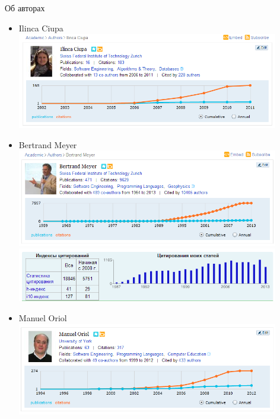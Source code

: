 \documentclass[11pt,pdf,hyperref=unicode,hyperref={bookmarks=false}]{beamer}
\begin{document}
        \begin{frame}[allowframebreaks]{Об авторах}
            \begin{itemize}
                \item Ilinca Ciupa \\ 
                        \includegraphics[keepaspectratio=true,width=0.9\textwidth,height=\textheight]{ciupa.png}\\
                        \framebreak
                \item Bertrand Meyer\\ 
                        \includegraphics[keepaspectratio=true,width=0.9\textwidth,height=\textheight]{meyer.png}\\
                        \includegraphics[keepaspectratio=true,width=0.9\textwidth,height=\textheight]{meyer2.png}\\
                        \framebreak
                \item Manuel Oriol\\ 
                        \includegraphics[keepaspectratio=true,width=0.9\textwidth,height=\textheight]{oriol.png}\\

\end{itemize}
\end{frame}
\end{document}
